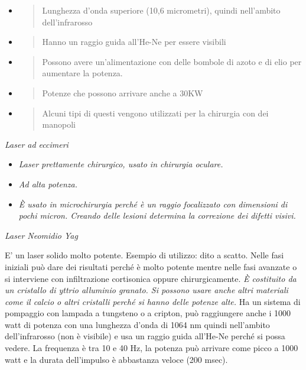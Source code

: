 \documentclass[]{article}
\begin{document}
\begin{itemize}
\item
  \begin{quote}
  Lunghezza d'onda superiore (10,6 micrometri), quindi nell'ambito
  dell'infrarosso
  \end{quote}
\item
  \begin{quote}
  Hanno un raggio guida all'He-Ne per essere visibili
  \end{quote}
\item
  \begin{quote}
  Possono avere un'alimentazione con delle bombole di azoto e di elio
  per aumentare la potenza.
  \end{quote}
\item
  \begin{quote}
  Potenze che possono arrivare anche a 30KW
  \end{quote}
\item
  \begin{quote}
  Alcuni tipi di questi vengono utilizzati per la chirurgia con dei
  manopoli
  \end{quote}
\end{itemize}

\emph{Laser ad eccimeri}

\begin{itemize}
\item
  \emph{Laser prettamente chirurgico, usato in chirurgia oculare. }
\item
  \emph{Ad alta potenza. }
\item
  \emph{È usato in microchirurgia perché è un raggio focalizzato con
  dimensioni di pochi micron. Creando delle lesioni determina la
  correzione dei difetti visivi.}
\end{itemize}

\emph{Laser Neomidio Yag}

E' un laser solido molto potente. Esempio di utilizzo: dito a scatto.
Nelle fasi iniziali può dare dei risultati perché è molto potente mentre
nelle fasi avanzate o si interviene con infiltrazione cortisonica oppure
chirurgicamente. \emph{È costituito da un cristallo di yttrio alluminio
granato. Si possono usare anche altri materiali come il calcio o altri
cristalli perché si hanno delle potenze alte.} Ha un sistema di
pompaggio con lampada a tungsteno o a cripton, può raggiungere anche i
1000 watt di potenza con una lunghezza d'onda di 1064 nm quindi
nell'ambito dell'infrarosso (non è visibile) e usa un raggio guida
all'He-Ne perché si possa vedere. La frequenza è tra 10 e 40 Hz, la
potenza può arrivare come picco a 1000 watt e la durata dell'impulso è
abbastanza veloce (200 msec).
\end{document}
